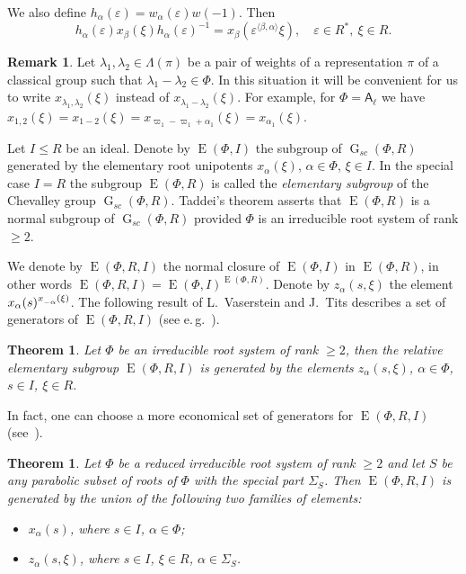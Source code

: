 \documentclass[12pt]{amsart}
\numberwithin{equation}{section}
\newcounter{thmcounter} \newcounter{lemmacounter}
\newtheorem{thm}[thmcounter]{Theorem}
\theoremstyle{definition}
\newtheorem{rem}[equation]{Remark}
\DeclareMathOperator{\G}{G}
\DeclareMathOperator{\E}{E}
\newcommand{\rA}{\mathsf{A}}
\def\ssub#1{\mathchoice
   {_{\lower2pt\hbox{$\scriptstyle #1$}}}
   {_{\lower2pt\hbox{$\scriptstyle #1$}}}
   {_{\lower1.5pt\hbox{$\scriptscriptstyle #1$}}}
   {_{\!\lower1.5pt\hbox{$\scriptscriptstyle #1$}}}}
\begin{document}
We also define $h_\alpha(\varepsilon)=w_\alpha(\varepsilon)w(-1)$. Then
\[ h_\alpha(\varepsilon)x_\beta(\xi)h_\alpha(\varepsilon)^{-1} = x_\beta\left(\varepsilon^{\langle\beta,\alpha\rangle}\xi\right),\quad \varepsilon\in R^*,\ \xi\in R. \]

\begin{rem} Let $\lambda_1, \lambda_2 \in \Lambda(\pi)$ be a pair of weights of a representation $\pi$ of a classical group such that $\lambda_1-\lambda_2\in \Phi$.
In this situation it will be convenient for us to write $x_{\lambda_1,\lambda_2}(\xi)$ instead of $x_{\lambda_1-\lambda_2}(\xi)$.
For example, for $\Phi=\rA_\ell$ we have $x_{1,2}(\xi)=x_{1-2}(\xi)=x_{\varpi_1 - \varpi_1 + \alpha_1}(\xi) = x_{\alpha_1}(\xi)$. \end{rem}

Let $I\leq R$ be an ideal. Denote by $\E(\Phi, I)$ the subgroup of $\G_{sc}(\Phi, R)$ generated by the elementary root unipotents $x_\alpha(\xi)$, $\alpha\in\Phi$, $\xi\in I$.
In the special case $I=R$ the subgroup $\E(\Phi, R)$ is called the {\it elementary subgroup} of the Chevalley group $\G_{sc}(\Phi, R)$.
Taddei's theorem asserts that $\E(\Phi, R)$ is a normal subgroup of $\G_{sc}(\Phi, R)$ provided $\Phi$ is an irreducible root system of rank $\geqslant 2$.

We denote by $\E(\Phi, R, I)$ the normal closure of $\E(\Phi, I)$ in $\E(\Phi, R)$, in other words $\E(\Phi, R, I) = \E(\Phi, I)^{\E(\Phi, R)}$.
Denote by $z_\alpha(s, \xi)$ the element $x_\alpha(s)^{x\ssub{-\alpha}(\xi)}$.
The following result of L.~Vaserstein and J.~Tits describes a set of generators of $\E(\Phi, R, I)$ (see e.\,g.~\cite[Theorem~2]{Va86}).

\begin{thm}\label{theorem:Tits-Vaserstein} Let $\Phi$ be an irreducible root system of rank $\geq 2$, then the relative elementary subgroup $\E(\Phi, R, I)$
is generated by the elements $z_\alpha(s, \xi)$, $\alpha\in \Phi$, $s\in I$, $\xi\in R$.
\end{thm}

In fact, one can choose a more economical set of generators for $\E(\Phi, R, I)$ (see~\cite[Theorem~3.4]{S}).
\begin{thm}\label{theorem:Stepanov}
Let $\Phi$ be a reduced irreducible root system of rank $\geq 2$ and let $S$ be any parabolic subset of roots of $\Phi$ with the special part $\Sigma_S$.
Then $\E(\Phi, R, I)$ is generated by the union of the following two families of elements:
\begin{itemize}
\item $x_{\alpha}(s)$, where $s\in I$, $\alpha\in\Phi$;
\item $z_\alpha(s,\xi)$, where $s\in I$, $\xi\in R$, $\alpha\in\Sigma_S$.
\end{itemize}
\end{thm}
 
\end{document}
